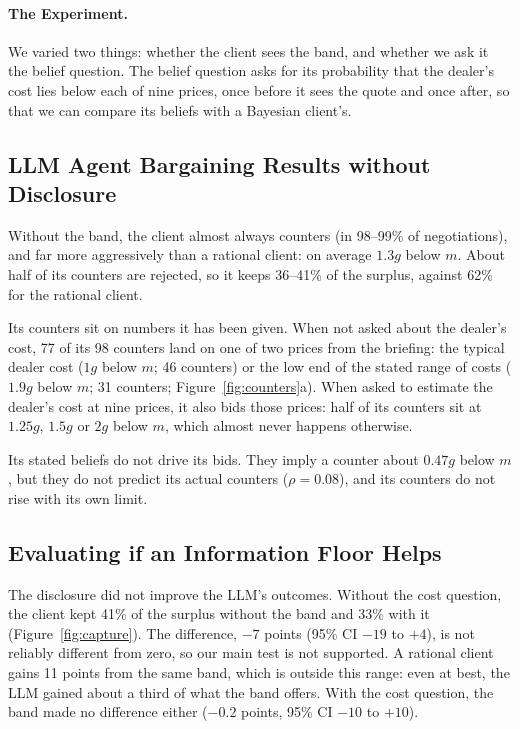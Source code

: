 \documentclass[sigconf]{acmart}
\begin{document}
\paragraph{The Experiment.}
We varied two things: whether the client sees the band, and whether we ask it the belief question. The belief question asks for its probability that the dealer's cost lies below each of nine prices, once before it sees the quote and once after, so that we can compare its beliefs with a Bayesian client's.

\subsection{LLM Agent Bargaining Results without Disclosure}

Without the band, the client almost always counters (in 98--99\% of negotiations), and far more aggressively than a rational client: on average $1.3g$ below $m$. About half of its counters are rejected, so it keeps 36--41\% of the surplus, against 62\% for the rational client.

Its counters sit on numbers it has been given. When not asked about the dealer's cost, 77 of its 98 counters land on one of two prices from the briefing: the typical dealer cost ($1g$ below $m$; 46 counters) or the low end of the stated range of costs ($1.9g$ below $m$; 31 counters; Figure~\ref{fig:counters}a). When asked to estimate the dealer's cost at nine prices, it also bids those prices: half of its counters sit at $1.25g$, $1.5g$ or $2g$ below $m$, which almost never happens otherwise.

Its stated beliefs do not drive its bids. They imply a counter about $0.47g$ below $m$, but they do not predict its actual counters ($\rho = 0.08$), and its counters do not rise with its own limit.

\subsection{Evaluating if an Information Floor Helps}

The disclosure did not improve the LLM's outcomes. Without the cost question, the client kept 41\% of the surplus without the band and 33\% with it (Figure~\ref{fig:capture}). The difference, $-7$ points (95\% CI $-19$ to $+4$), is not reliably different from zero, so our main test is not supported. A rational client gains 11 points from the same band, which is outside this range: even at best, the LLM gained about a third of what the band offers. With the cost question, the band made no difference either ($-0.2$ points, 95\% CI $-10$ to $+10$).
\end{document}
